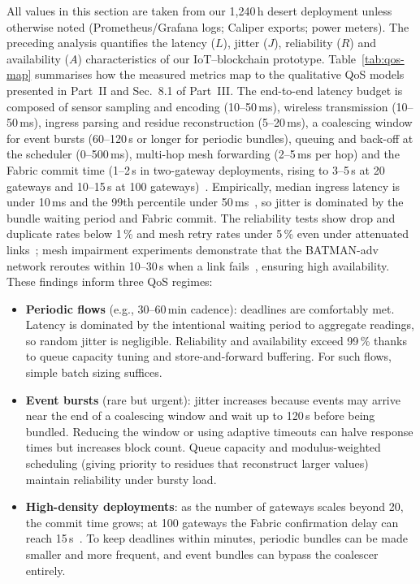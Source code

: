 \documentclass[12pt,onecolumn]{IEEEtran} %
\begin{document}
All values in this section are taken from our 1{,}240\,h desert deployment unless otherwise noted (Prometheus/Grafana logs; Caliper exports; power meters). The preceding analysis quantifies the latency ($L$), jitter ($J$), reliability ($R$) and availability ($A$) characteristics of our IoT–blockchain prototype. Table~\ref{tab:qos-map} summarises how the measured metrics map to the qualitative QoS models presented in Part~II and Sec.~8.1 of Part~III. The end-to-end latency budget is composed of sensor sampling and encoding (10–50\,ms), wireless transmission (10–50\,ms), ingress parsing and residue reconstruction (5–20\,ms), a coalescing window for event bursts (60–120\,s or longer for periodic bundles), queuing and back-off at the scheduler (0–500\,ms), multi-hop mesh forwarding (2–5\,ms per hop) and the Fabric commit time (1–2\,s in two-gateway deployments, rising to 3–5\,s at 20 gateways and 10–15\,s at 100 gateways)~\cite{ref76853680998234}. Empirically, median ingress latency is under 10\,ms and the 99th percentile under 50\,ms~\cite{ref76853680998234}, so jitter is dominated by the bundle waiting period and Fabric commit. The reliability tests show drop and duplicate rates below 1\,\% and mesh retry rates under 5\,\% even under attenuated links~\cite{ref76853680998234}; mesh impairment experiments demonstrate that the BATMAN-adv network reroutes within 10–30\,s when a link fails~\cite{ref76853680998234}, ensuring high availability. These findings inform three QoS regimes:
\begin{itemize}
  \item \textbf{Periodic flows} (e.g., 30–60\,min cadence): deadlines are comfortably met. Latency is dominated by the intentional waiting period to aggregate readings, so random jitter is negligible. Reliability and availability exceed 99\,\% thanks to queue capacity tuning and store-and-forward buffering. For such flows, simple batch sizing suffices.
  \item \textbf{Event bursts} (rare but urgent): jitter increases because events may arrive near the end of a coalescing window and wait up to 120\,s before being bundled. Reducing the window or using adaptive timeouts can halve response times but increases block count. Queue capacity and modulus-weighted scheduling (giving priority to residues that reconstruct larger values) maintain reliability under bursty load.
  \item \textbf{High-density deployments}: as the number of gateways scales beyond 20, the commit time grows; at 100 gateways the Fabric confirmation delay can reach 15\,s~\cite{ref76853680998234}. To keep deadlines within minutes, periodic bundles can be made smaller and more frequent, and event bundles can bypass the coalescer entirely.
\end{itemize}
\end{document}
